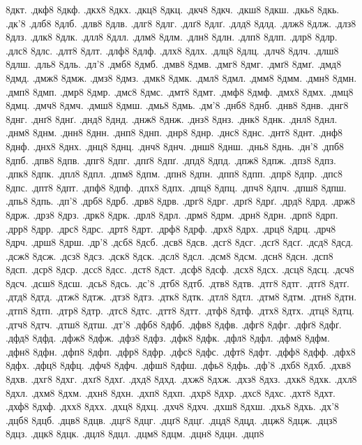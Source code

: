{8дкт.
.дкф8
8дкф.
.дкх8
8дкх.
.дкц8
8дкц.
.дкч8
8дкч.
.дкш8
8дкш.
.дкь8
8дкь.
.дк'8
.длб8
8длб.
.длв8
8длв.
.длг8
8длг.
.длґ8
8длґ.
.длд8
8длд.
.длж8
8длж.
.длз8
8длз.
.длк8
8длк.
.длл8
8длл.
.длм8
8длм.
.длн8
8длн.
.длп8
8длп.
.длр8
8длр.
.длс8
8длс.
.длт8
8длт.
.длф8
8длф.
.длх8
8длх.
.длц8
8длц.
.длч8
8длч.
.длш8
8длш.
.дль8
8дль.
.дл'8
.дмб8
8дмб.
.дмв8
8дмв.
.дмг8
8дмг.
.дмґ8
8дмґ.
.дмд8
8дмд.
.дмж8
8дмж.
.дмз8
8дмз.
.дмк8
8дмк.
.дмл8
8дмл.
.дмм8
8дмм.
.дмн8
8дмн.
.дмп8
8дмп.
.дмр8
8дмр.
.дмс8
8дмс.
.дмт8
8дмт.
.дмф8
8дмф.
.дмх8
8дмх.
.дмц8
8дмц.
.дмч8
8дмч.
.дмш8
8дмш.
.дмь8
8дмь.
.дм'8
.днб8
8днб.
.днв8
8днв.
.днг8
8днг.
.днґ8
8днґ.
.днд8
8днд.
.днж8
8днж.
.днз8
8днз.
.днк8
8днк.
.днл8
8днл.
.днм8
8днм.
.днн8
8днн.
.днп8
8днп.
.днр8
8днр.
.днс8
8днс.
.днт8
8днт.
.днф8
8днф.
.днх8
8днх.
.днц8
8днц.
.днч8
8днч.
.днш8
8днш.
.днь8
8днь.
.дн'8
.дпб8
8дпб.
.дпв8
8дпв.
.дпг8
8дпг.
.дпґ8
8дпґ.
.дпд8
8дпд.
.дпж8
8дпж.
.дпз8
8дпз.
.дпк8
8дпк.
.дпл8
8дпл.
.дпм8
8дпм.
.дпн8
8дпн.
.дпп8
8дпп.
.дпр8
8дпр.
.дпс8
8дпс.
.дпт8
8дпт.
.дпф8
8дпф.
.дпх8
8дпх.
.дпц8
8дпц.
.дпч8
8дпч.
.дпш8
8дпш.
.дпь8
8дпь.
.дп'8
.дрб8
8дрб.
.дрв8
8дрв.
.дрг8
8дрг.
.дрґ8
8дрґ.
.дрд8
8дрд.
.држ8
8држ.
.дрз8
8дрз.
.дрк8
8дрк.
.дрл8
8дрл.
.дрм8
8дрм.
.дрн8
8дрн.
.дрп8
8дрп.
.дрр8
8дрр.
.дрс8
8дрс.
.дрт8
8дрт.
.дрф8
8дрф.
.дрх8
8дрх.
.дрц8
8дрц.
.дрч8
8дрч.
.дрш8
8дрш.
.др'8
.дсб8
8дсб.
.дсв8
8дсв.
.дсг8
8дсг.
.дсґ8
8дсґ.
.дсд8
8дсд.
.дсж8
8дсж.
.дсз8
8дсз.
.дск8
8дск.
.дсл8
8дсл.
.дсм8
8дсм.
.дсн8
8дсн.
.дсп8
8дсп.
.дср8
8дср.
.дсс8
8дсс.
.дст8
8дст.
.дсф8
8дсф.
.дсх8
8дсх.
.дсц8
8дсц.
.дсч8
8дсч.
.дсш8
8дсш.
.дсь8
8дсь.
.дс'8
.дтб8
8дтб.
.дтв8
8дтв.
.дтг8
8дтг.
.дтґ8
8дтґ.
.дтд8
8дтд.
.дтж8
8дтж.
.дтз8
8дтз.
.дтк8
8дтк.
.дтл8
8дтл.
.дтм8
8дтм.
.дтн8
8дтн.
.дтп8
8дтп.
.дтр8
8дтр.
.дтс8
8дтс.
.дтт8
8дтт.
.дтф8
8дтф.
.дтх8
8дтх.
.дтц8
8дтц.
.дтч8
8дтч.
.дтш8
8дтш.
.дт'8
.дфб8
8дфб.
.дфв8
8дфв.
.дфг8
8дфг.
.дфґ8
8дфґ.
.дфд8
8дфд.
.дфж8
8дфж.
.дфз8
8дфз.
.дфк8
8дфк.
.дфл8
8дфл.
.дфм8
8дфм.
.дфн8
8дфн.
.дфп8
8дфп.
.дфр8
8дфр.
.дфс8
8дфс.
.дфт8
8дфт.
.дфф8
8дфф.
.дфх8
8дфх.
.дфц8
8дфц.
.дфч8
8дфч.
.дфш8
8дфш.
.дфь8
8дфь.
.дф'8
.дхб8
8дхб.
.дхв8
8дхв.
.дхг8
8дхг.
.дхґ8
8дхґ.
.дхд8
8дхд.
.дхж8
8дхж.
.дхз8
8дхз.
.дхк8
8дхк.
.дхл8
8дхл.
.дхм8
8дхм.
.дхн8
8дхн.
.дхп8
8дхп.
.дхр8
8дхр.
.дхс8
8дхс.
.дхт8
8дхт.
.дхф8
8дхф.
.дхх8
8дхх.
.дхц8
8дхц.
.дхч8
8дхч.
.дхш8
8дхш.
.дхь8
8дхь.
.дх'8
.дцб8
8дцб.
.дцв8
8дцв.
.дцг8
8дцг.
.дцґ8
8дцґ.
.дцд8
8дцд.
.дцж8
8дцж.
.дцз8
8дцз.
.дцк8
8дцк.
.дцл8
8дцл.
.дцм8
8дцм.
.дцн8
8дцн.
.дцп8
}
